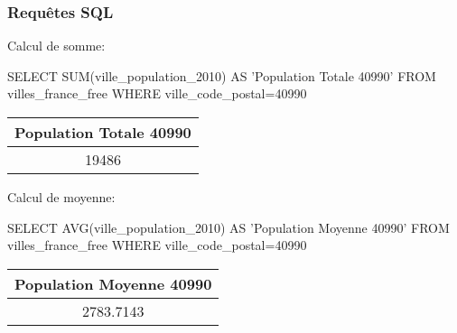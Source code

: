 \begin{frame}[fragile]
\frametitle{Requêtes SQL}

Calcul de somme:

\begin{GrayBox}[0.85\textwidth]
\begin{semiverbatim}\small
SELECT SUM(ville_population_2010) AS 'Population Totale 40990'
FROM villes_france_free
WHERE ville_code_postal=40990
\end{semiverbatim}
\end{GrayBox}

\begin{center}
\begin{tabular}{|c|}
\hline
\textbf{Population Totale 40990} \\
\hline
19486 \\
\hline
\end{tabular}
\end{center}

Calcul de moyenne:

\begin{GrayBox}[0.85\textwidth]
\begin{semiverbatim}\small
SELECT AVG(ville_population_2010) AS 'Population Moyenne 40990'
FROM villes_france_free
WHERE ville_code_postal=40990
\end{semiverbatim}
\end{GrayBox}

\begin{center}
\begin{tabular}{|c|}
\hline
\textbf{Population Moyenne 40990} \\
\hline
2783.7143 \\
\hline
\end{tabular}
\end{center}

\end{frame}


